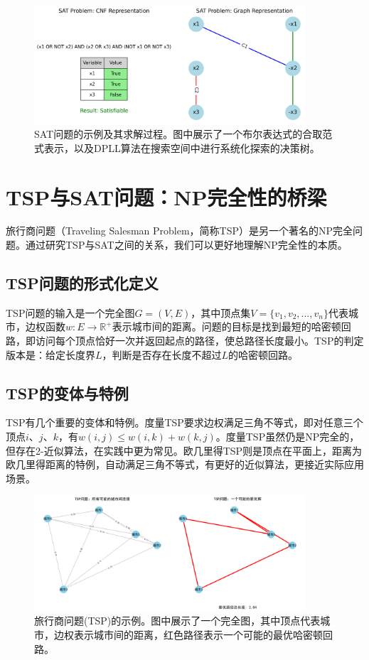 \documentclass[a4paper,12pt]{ctexart}
\begin{document}
\begin{figure}[H]
    \centering
    \includegraphics[width=0.9\textwidth]{img/sat_example.png}
    \caption{SAT问题的示例及其求解过程。图中展示了一个布尔表达式的合取范式表示，以及DPLL算法在搜索空间中进行系统化探索的决策树。}
    \label{fig:sat_example}
\end{figure}

\section{TSP与SAT问题：NP完全性的桥梁}
旅行商问题（Traveling Salesman Problem，简称TSP）是另一个著名的NP完全问题。通过研究TSP与SAT之间的关系，我们可以更好地理解NP完全性的本质。

\subsection{TSP问题的形式化定义}
TSP问题的输入是一个完全图$G = (V,E)$，其中顶点集$V = \{v_1, v_2, \ldots, v_n\}$代表城市，边权函数$w: E \rightarrow \mathbb{R}^+$表示城市间的距离。问题的目标是找到最短的哈密顿回路，即访问每个顶点恰好一次并返回起点的路径，使总路径长度最小。TSP的判定版本是：给定长度界$L$，判断是否存在长度不超过$L$的哈密顿回路。

\subsection{TSP的变体与特例}
TSP有几个重要的变体和特例。度量TSP要求边权满足三角不等式，即对任意三个顶点$i$、$j$、$k$，有$w(i,j) \leq w(i,k) + w(k,j)$。度量TSP虽然仍是NP完全的，但存在2-近似算法，在实践中更为常见。欧几里得TSP则是顶点在平面上，距离为欧几里得距离的特例，自动满足三角不等式，有更好的近似算法，更接近实际应用场景。

\begin{figure}[H]
    \centering
    \includegraphics[width=0.9\textwidth]{img/tsp_example.png}
    \caption{旅行商问题(TSP)的示例。图中展示了一个完全图，其中顶点代表城市，边权表示城市间的距离，红色路径表示一个可能的最优哈密顿回路。}
    \label{fig:tsp_example}
\end{figure}
\end{document}

